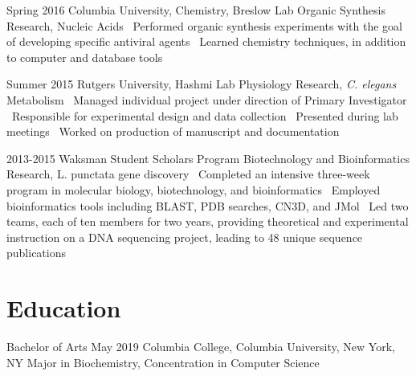 \documentclass{bscv}
\begin{document}
\begin{eventlist}
\item{Spring 2016}
  {Columbia University, Chemistry, Breslow Lab}
  {Organic Synthesis Research, Nucleic Acids}
  {\textbullet\ Performed organic synthesis experiments with the goal of developing specific antiviral agents \newline \textbullet\ Learned chemistry techniques, in addition to computer and database tools
  \newline \newline \newline \newline}



\item{Summer 2015}
  {Rutgers University, Hashmi Lab}
  { Physiology Research, \textit{C. elegans} Metabolism}
  {\textbullet\ Managed individual project under direction of Primary Investigator \newline \textbullet\ Responsible for experimental design and data collection \newline \textbullet\  Presented during lab meetings \newline \textbullet \ Worked on production of manuscript and documentation \newline}

  
\item{2013-2015}
  {Waksman Student Scholars Program}
  {Biotechnology and Bioinformatics Research, L. punctata gene discovery}
  {\textbullet\  Completed an intensive three-week program in molecular biology, biotechnology, and bioinformatics \newline \textbullet\  Employed bioinformatics tools including BLAST, PDB searches, CN3D, and JMol \newline \textbullet\  Led two teams, each of ten members for two years, providing theoretical and experimental instruction on a DNA sequencing project, leading to 48 unique sequence publications}
  

\end{eventlist}



\section{Education}

\begin{yearlist}

\item[Bachelor of Arts]{May 2019}
  {Columbia College, \newline Columbia University, \newline New York, NY} {Major in Biochemistry, \newline Concentration in Computer Science}

\end{yearlist}
\end{document}
